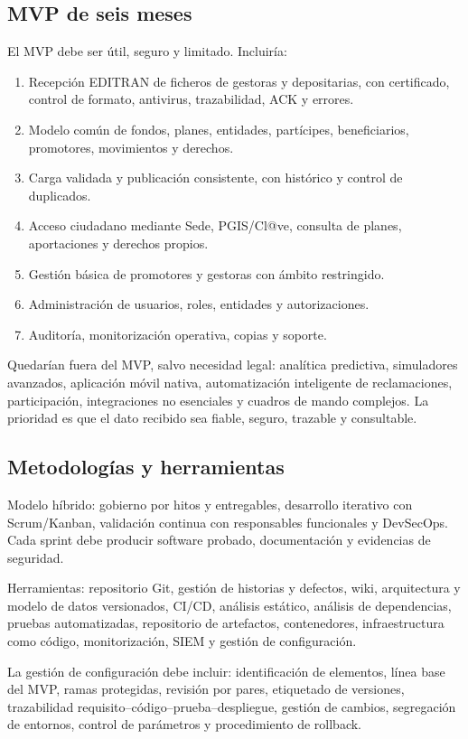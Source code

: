 \documentclass[11pt,a4paper]{article}
\begin{document}
\subsection{MVP de seis meses}

El MVP debe ser útil, seguro y limitado. Incluiría:
\begin{enumerate}
\item Recepción EDITRAN de ficheros de gestoras y depositarias, con certificado, control de formato, antivirus, trazabilidad, ACK y errores.
\item Modelo común de fondos, planes, entidades, partícipes, beneficiarios, promotores, movimientos y derechos.
\item Carga validada y publicación consistente, con histórico y control de duplicados.
\item Acceso ciudadano mediante Sede, PGIS/Cl@ve, consulta de planes, aportaciones y derechos propios.
\item Gestión básica de promotores y gestoras con ámbito restringido.
\item Administración de usuarios, roles, entidades y autorizaciones.
\item Auditoría, monitorización operativa, copias y soporte.
\end{enumerate}

Quedarían fuera del MVP, salvo necesidad legal: analítica predictiva, simuladores avanzados, aplicación móvil nativa, automatización inteligente de reclamaciones, participación, integraciones no esenciales y cuadros de mando complejos. La prioridad es que el dato recibido sea fiable, seguro, trazable y consultable.

\subsection{Metodologías y herramientas}

Modelo híbrido: gobierno por hitos y entregables, desarrollo iterativo con Scrum/Kanban, validación continua con responsables funcionales y DevSecOps. Cada sprint debe producir software probado, documentación y evidencias de seguridad.

Herramientas: repositorio Git, gestión de historias y defectos, wiki, arquitectura y modelo de datos versionados, CI/CD, análisis estático, análisis de dependencias, pruebas automatizadas, repositorio de artefactos, contenedores, infraestructura como código, monitorización, SIEM y gestión de configuración.

La gestión de configuración debe incluir: identificación de elementos, línea base del MVP, ramas protegidas, revisión por pares, etiquetado de versiones, trazabilidad requisito--código--prueba--despliegue, gestión de cambios, segregación de entornos, control de parámetros y procedimiento de rollback.
\end{document}
